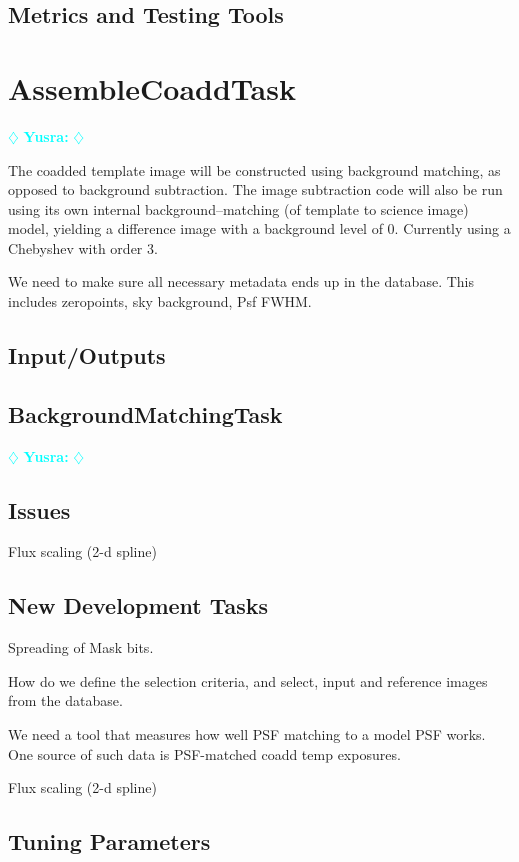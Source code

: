 \documentclass[12pt]{article}
\newcommand{\yusra} { \textcolor{cyan} {
\ensuremath{\diamondsuit} {\bf Yusra:}  
\ensuremath{\diamondsuit} } }
\begin{document}
\subsection{Metrics and Testing Tools}


\clearpage 
\section{AssembleCoaddTask} \yusra

The coadded template image will be constructed using background
matching, as opposed to background subtraction.  The image subtraction
code will also be run using its own internal background--matching (of
template to science image) model, yielding a difference image with a
background level of 0.  Currently using a Chebyshev with order 3.

We need to make sure all necessary metadata ends up in the database.
This includes zeropoints, sky background, Psf FWHM.

\subsection{Input/Outputs}

\subsection{BackgroundMatchingTask} \yusra

\subsection{Issues}

Flux scaling (2-d spline)

\subsection{New Development Tasks}
Spreading of Mask bits.  

How do we define the selection criteria, and select, input and
reference images from the database.

We need a tool that measures how well PSF matching to a model PSF
works. One source of such data is PSF-matched coadd temp exposures.

Flux scaling (2-d spline)

\subsection{Tuning Parameters}
\end{document}
